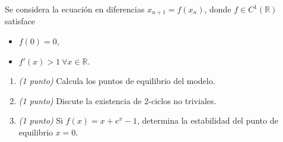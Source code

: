 \documentclass[12pt]{article}
\begin{document}
    \begin{ejercicio}
        Se considera la ecuación en diferencias $x_{n+1} = f(x_n)$, donde $f \in C^1(\mathbb{R})$ satisface
        \begin{itemize}
            \item $f(0) = 0$,
            \item $f'(x) > 1 \ \forall x \in \mathbb{R}$.
        \end{itemize}
        
        \begin{enumerate}
            \item \emph{(1 punto)} Calcula los puntos de equilibrio del modelo.
            \item \emph{(1 punto)} Discute la existencia de 2-ciclos no triviales.
            \item \emph{(1 punto)} Si $f(x) = x + e^x - 1$, determina la estabilidad del punto de equilibrio $x = 0$.
        \end{enumerate}
    \end{ejercicio}

    \newpage
	\setcounter{ejercicio}{0}
\end{document}
